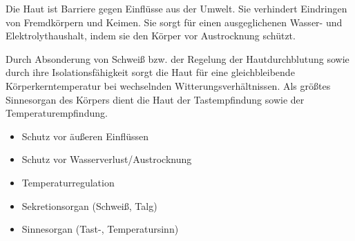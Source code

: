{%
Die Haut ist  Barriere gegen Einflüsse aus der
Umwelt. Sie verhindert Eindringen von Fremdkörpern und
Keimen. Sie sorgt für einen ausgeglichenen Wasser- und
Elektrolythaushalt, indem sie den Körper vor Austrocknung
schützt.

Durch Absonderung von Schweiß bzw. der Regelung der
Hautdurchblutung sowie durch ihre Isolationsfähigkeit sorgt
die Haut für eine gleichbleibende Körperkerntemperatur bei
wechselnden Witterungsverhältnissen.
Als größtes Sinnesorgan des Körpers dient die Haut der
Tastempfindung sowie der Temperaturempfindung.



}
{
\begin{itemize}
  \item Schutz vor äußeren Einflüssen
  \item Schutz vor Wasserverlust/Austrocknung
  \item Temperaturregulation
  \item Sekretionsorgan (Schweiß, Talg)
  \item Sinnesorgan (Tast-, Temperatursinn)
\end{itemize}
}{}{}{}

